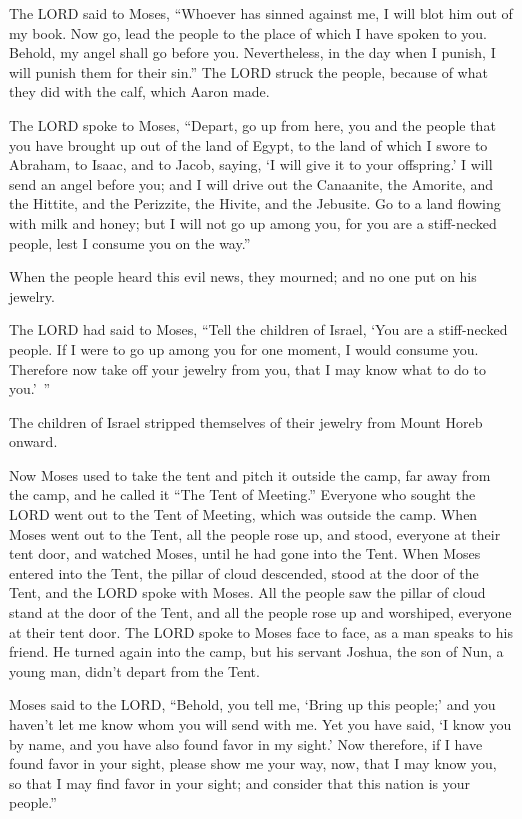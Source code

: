 \myverse{}The LORD said to Moses, “Whoever has sinned against me, I will
blot him out of my book.
\myverse{}Now go, lead the people to the place of which I have spoken to you. Behold,
my angel shall go before you. Nevertheless, in the day when I punish, I will punish them for their sin.”
\myverse{}The LORD struck the people, because of what they did with the calf, which
Aaron made.


\mychapter{} \myverse*{}The LORD spoke to Moses, “Depart, go up from here, you and the
people that you have brought up out of the land of Egypt, to the land of which I swore to Abraham, to
Isaac, and to Jacob, saying, ‘I will give it to your offspring.’
\myverse{}I will send an angel before you; and I will drive out the Canaanite, the Amorite,
and the Hittite, and the Perizzite, the Hivite, and the Jebusite.
\myverse{}Go to a land flowing with milk and honey; but I will not go up among you, for
you are a stiff-necked people, lest I consume you on the way.”


\myverse{}When the people heard this evil news, they mourned; and no one
put on his jewelry.


\myverse{}The LORD had said to Moses, “Tell the children of Israel, ‘You
are a stiff-necked people. If I were to go up among you for one moment, I would consume you. Therefore
now take off your jewelry from you, that I may know what to do to you.’ ”


\myverse{}The children of Israel stripped themselves of their jewelry from
Mount Horeb onward.


\myverse{}Now Moses used to take the tent and pitch it outside the camp,
far away from the camp, and he called it “The Tent of Meeting.” Everyone who sought the LORD went out
to the Tent of Meeting, which was outside the camp.
\myverse{}When Moses went out to the Tent, all the people rose up, and stood, everyone
at their tent door, and watched Moses, until he had gone into the Tent.
\myverse{}When Moses entered into the Tent, the pillar of cloud descended, stood at the
door of the Tent, and the LORD spoke with Moses.
\myverse{}All the people saw the pillar of cloud stand at the door of the Tent, and
all the people rose up and worshiped, everyone at their tent door.
\myverse{}The LORD spoke to Moses face to face, as a man speaks to his friend. He turned
again into the camp, but his servant Joshua, the son of Nun, a young man, didn’t depart from the Tent.


\myverse{}Moses said to the LORD, “Behold, you tell me, ‘Bring up this
people;’ and you haven’t let me know whom you will send with me. Yet you have said, ‘I know you by name,
and you have also found favor in my sight.’
\myverse{}Now therefore, if I have found favor in your sight, please show me your way,
now, that I may know you, so that I may find favor in your sight; and consider that this nation is your
people.”



